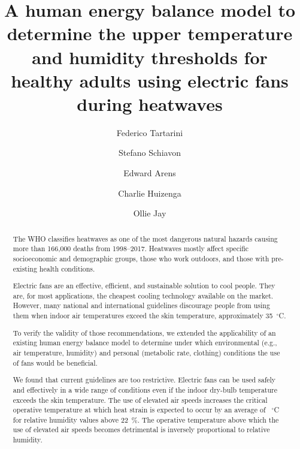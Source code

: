
\begin{frontmatter}

\title{A human energy balance model to determine the upper temperature and humidity thresholds for healthy adults using electric fans during heatwaves}


\author[sinBerBest]{Federico Tartarini}
\author[CBE]{Stefano Schiavon}
\author[CBE]{Edward Arens}
\author[CBE]{Charlie Huizenga}
 \author[USYD]{Ollie Jay}

\address[sinBerBest]{SinBerBEST, Berkeley Education Alliance for Research in Singapore, Singapore}
\address[CBE]{Center for the Built Environment, University of California, Berkeley, USA}
 \address[USYD]{Sydney School of Health Sciences, Faculty of Medicine and Health, The University of Sydney, Sydney, Australia}

\begin{abstract}
    The WHO classifies heatwaves as one of the most dangerous natural hazards causing more than 166,000 deaths from 1998--2017.
    Heatwaves mostly affect specific socioeconomic and demographic groups, those who work outdoors, and those with pre-existing health conditions.
    
    Electric fans are an effective, efficient, and sustainable solution to cool people.
    They are, for most applications, the cheapest cooling technology available on the market.
    However, many national and international guidelines discourage people from using them when indoor air temperatures exceed the skin temperature, approximately 35~$^{\circ}$C\@.
    
    To verify the validity of those recommendations, we extended the applicability of an existing human energy balance model to determine under which environmental (e.g., air temperature, humidity) and personal (metabolic rate, clothing) conditions the use of fans would be beneficial.
    
    We found that current guidelines are too restrictive.
    Electric fans can be used safely and effectively in a wide range of conditions even if the indoor dry-bulb temperature exceeds the skin temperature.
    The use of elevated air speeds increases the critical operative temperature at which heat strain is expected to occur by an average of ~$^{\circ}$C for relative humidity values above 22~\%\@.
    The operative temperature above which the use of elevated air speeds becomes detrimental is inversely proportional to relative humidity.
    

\end{abstract}
\end{frontmatter}
